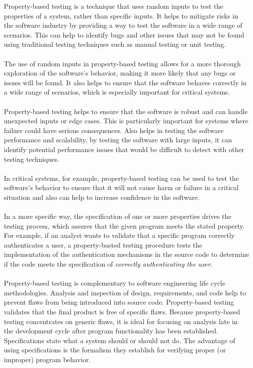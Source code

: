 \documentclass{report}
\begin{document}
Property-based testing is a technique that uses random inputs to test the properties of a system, rather than specific inputs. It helps to mitigate risks in the software industry by providing a way to test the software in a wide range of scenarios. This can help to identify bugs and other issues that may not be found using traditional testing techniques such as manual testing or unit testing.\\\\
The use of random inputs in property-based testing allows for a more thorough exploration of the software's behavior, making it more likely that any bugs or issues will be found. It also helps to ensure that the software behaves correctly in a wide range of scenarios, which is especially important for critical systems.\\\\
Property-based testing helps to ensure that the software is robust and can handle unexpected inputs or edge cases. This is particularly important for systems where failure could have serious consequences. Also helps in testing the software performance and scalability, by testing the software with large inputs, it can identify potential performance issues that would be difficult to detect with other testing techniques.\\\\
In critical systems, for example, property-based testing can be used to test the software's behavior to ensure that it will not cause harm or failure in a critical situation and also can help to increase confidence in the software.\\\\
In a more specific way, the specification of one or more properties drives the testing process, which assures that the given program meets the stated property. For example, if an analyst wants to validate that a specific program correctly authenticates a user, a property-basted testing procedure tests the implementation of the authentication mechanisms in the source code to determine if the code meets the specification of \textit{correctly authenticating the user}.\\\\
Property-based testing is complementary to software engineering life cycle methodologies. Analysis and inspection of design, requirements, and code help to prevent flaws from being introduced into source code. Property-based testing validates that the final product is free of specific flaws. Because property-based testing concentrates on generic flaws, it is ideal for focusing on analysis late in the development cycle after program functionality has been established. Specifications state what a system should or should not do. The advantage of using specifications is the formalism they establish for verifying proper (or improper) program behavior.\\\\
\end{document}
